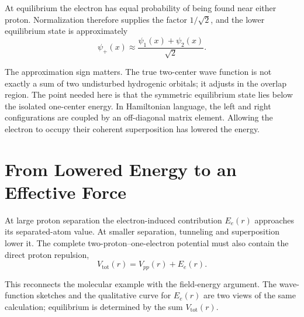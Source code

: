 At equilibrium the electron has equal probability of being found near either proton. Normalization therefore supplies the factor \(1/\sqrt2\), and the lower equilibrium state is approximately
\begin{equation}
\psi_+(x)\approx \frac{\psi_1(x)+\psi_2(x)}{\sqrt2}.
\end{equation}

The approximation sign matters. The true two-center wave function is not exactly a sum of two undisturbed hydrogenic orbitals; it adjusts in the overlap region. The point needed here is that the symmetric equilibrium state lies below the isolated one-center energy. In Hamiltonian language, the left and right configurations are coupled by an off-diagonal matrix element. Allowing the electron to occupy their coherent superposition has lowered the energy.

\section{From Lowered Energy to an Effective Force}

At large proton separation the electron-induced contribution \(E_e(r)\) approaches its separated-atom value. At smaller separation, tunneling and superposition lower it. The complete two-proton--one-electron potential must also contain the direct proton repulsion,
\begin{equation}
V_{\mathrm{tot}}(r)=V_{pp}(r)+E_e(r).
\end{equation}

This reconnects the molecular example with the field-energy argument. The wave-function sketches and the qualitative curve for \(E_e(r)\) are two views of the same calculation; equilibrium is determined by the sum \(V_{\mathrm{tot}}(r)\).


